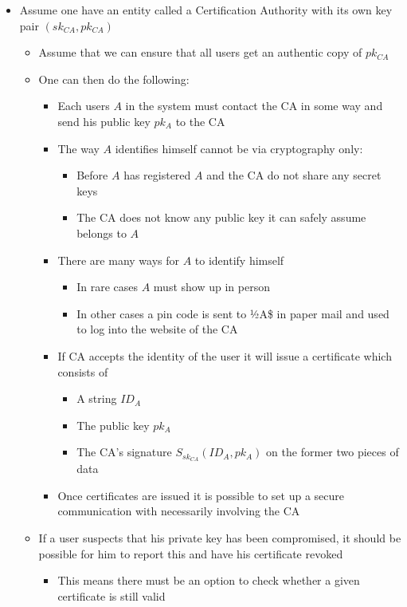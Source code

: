 \documentclass[11pt]{article}
\begin{document}
\begin{itemize}
\item Assume one have an entity called a Certification Authority with its own key pair \((sk_{CA}, pk_{CA})\)
\begin{itemize}
\item Assume that we can ensure that all users get an authentic copy of \(pk_{CA}\)
\item One can then do the following:
\begin{itemize}
\item Each users \(A\) in the system must contact the CA in some way and send his public key \(pk_A\) to the CA
\item The way \(A\) identifies himself cannot be via cryptography only:
\begin{itemize}
\item Before \(A\) has registered \(A\) and the CA do not share any secret keys
\item The CA does not know any public key it can safely assume belongs to \(A\)
\end{itemize}
\item There are many ways for \(A\) to identify himself
\begin{itemize}
\item In rare cases \(A\) must show up in person
\item In other cases a pin code is sent to ½A\$ in paper mail and used to log into the website of the CA
\end{itemize}
\item If CA accepts the identity of the user it will issue a certificate which consists of
\begin{itemize}
\item A string \(ID_A\)
\item The public key \(pk_A\)
\item The CA's signature \(S_{sk_{CA}}(ID_A,pk_A)\) on the former two pieces of data
\end{itemize}
\item Once certificates are issued it is possible to set up a secure communication with necessarily involving the CA
\end{itemize}
\item If a user suspects that his private key has been compromised, it should be possible for him to report this and have his certificate revoked
\begin{itemize}
\item This means there must be an option to check whether a given certificate is still valid

\end{itemize}
\end{itemize}
\end{itemize}
\end{document}

